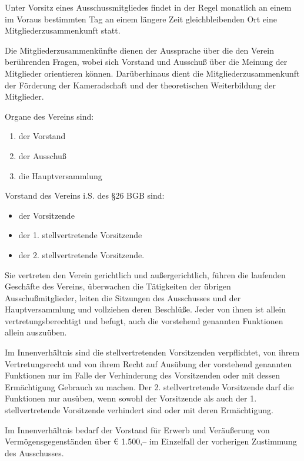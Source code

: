 \documentclass[10pt,a4paper,parskip=half]{scrartcl}
\begin{document}
\begin{contract}
\begin{multicols}{2}
    Unter Vorsitz eines Ausschussmitgliedes findet in der Regel monatlich an einem im Voraus bestimmten Tag an einem längere Zeit gleichbleibenden Ort eine Mitgliederzusammenkunft statt.
    
    Die Mitgliederzusammenkünfte dienen der Aussprache über die den Verein berührenden Fragen,
    wobei sich Vorstand und Ausschuß über die Meinung der Mitglieder orientieren können.
    Darüberhinaus dient die Mitgliederzusammenkunft der Förderung der Kameradschaft und der theoretischen Weiterbildung der Mitglieder.
    
    Organe des Vereins sind:
    \begin{enumerate}[noitemsep]
      \item der Vorstand
      \item der Ausschuß
      \item die Hauptversammlung
    \end{enumerate}
    
    Vorstand des Vereins i.S. des §26 BGB sind:
    \begin{itemize}[noitemsep]
      \item der Vorsitzende
      \item der 1. stellvertretende Vorsitzende
      \item der 2. stellvertretende Vorsitzende.
    \end{itemize}
    Sie vertreten den Verein gerichtlich und außergerichtlich,
    führen die laufenden Geschäfte des Vereins,
    überwachen die Tätigkeiten der übrigen Ausschußmitglieder,
    leiten die Sitzungen des Ausschusses und der Hauptversammlung und vollziehen deren Beschlüße.
    Jeder von ihnen ist allein vertretungsberechtigt und befugt,
    auch die vorstehend genannten Funktionen allein auszuüben.
    
    Im Innenverhältnis sind die stellvertretenden Vorsitzenden verpflichtet,
    von ihrem Vertretungsrecht und von ihrem Recht auf Ausübung der vorstehend genannten Funktionen nur im Falle der Verhinderung des Vorsitzenden oder mit dessen Ermächtigung Gebrauch zu machen.
    Der 2. stellvertretende Vorsitzende darf die Funktionen nur ausüben,
    wenn sowohl der
    Vorsitzende als auch der 1. stellvertretende Vorsitzende verhindert sind oder mit deren Ermächtigung.
    
    Im Innenverhältnis bedarf der Vorstand für Erwerb und Veräußerung von Vermögensgegenständen über € 1.500,-- im Einzelfall der vorherigen Zustimmung des Ausschusses.
    

\end{multicols}
\end{contract}
\end{document}
